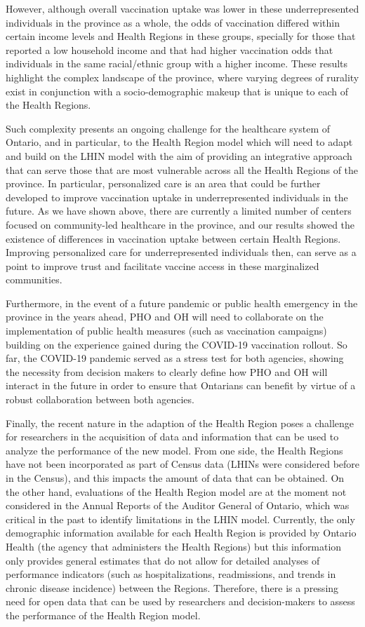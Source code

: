 \documentclass[
]{article}
\begin{document}
However, although overall vaccination uptake was lower in these
underrepresented individuals in the province as a whole, the odds of
vaccination differed within certain income levels and Health Regions in
these groups, specially for those that reported a low household income
and that had higher vaccination odds that individuals in the same
racial/ethnic group with a higher income. These results highlight the
complex landscape of the province, where varying degrees of rurality
exist in conjunction with a socio-demographic makeup that is unique to
each of the Health Regions.

Such complexity presents an ongoing challenge for the healthcare system
of Ontario, and in particular, to the Health Region model which will
need to adapt and build on the LHIN model with the aim of providing an
integrative approach that can serve those that are most vulnerable
across all the Health Regions of the province. In particular,
personalized care is an area that could be further developed to improve
vaccination uptake in underrepresented individuals in the future. As we
have shown above, there are currently a limited number of centers
focused on community-led healthcare in the province, and our results
showed the existence of differences in vaccination uptake between
certain Health Regions. Improving personalized care for underrepresented
individuals then, can serve as a point to improve trust and facilitate
vaccine access in these marginalized communities.

Furthermore, in the event of a future pandemic or public health
emergency in the province in the years ahead, PHO and OH will need to
collaborate on the implementation of public health measures (such as
vaccination campaigns) building on the experience gained during the
COVID-19 vaccination rollout. So far, the COVID-19 pandemic served as a
stress test for both agencies, showing the necessity from decision
makers to clearly define how PHO and OH will interact in the future in
order to ensure that Ontarians can benefit by virtue of a robust
collaboration between both agencies.

Finally, the recent nature in the adaption of the Health Region poses a
challenge for researchers in the acquisition of data and information
that can be used to analyze the performance of the new model. From one
side, the Health Regions have not been incorporated as part of Census
data (LHINs were considered before in the Census), and this impacts the
amount of data that can be obtained. On the other hand, evaluations of
the Health Region model are at the moment not considered in the Annual
Reports of the Auditor General of Ontario, which was critical in the
past to identify limitations in the LHIN model. Currently, the only
demographic information available for each Health Region is provided by
Ontario Health (the agency that administers the Health Regions) but this
information only provides general estimates that do not allow for
detailed analyses of performance indicators (such as hospitalizations,
readmissions, and trends in chronic disease incidence) between the
Regions. Therefore, there is a pressing need for open data that can be
used by researchers and decision-makers to assess the performance of the
Health Region model.
\end{document}
